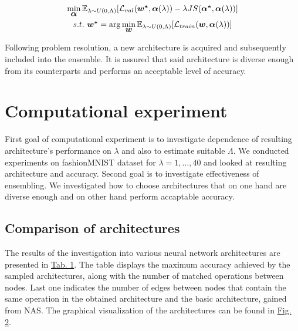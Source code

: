 \documentclass{article}
\begin{document}
\begin{gather*}
    \min_{\mbox{\boldmath{$\alpha$}}} \mathbb{E}_{\lambda \sim U(0, \Lambda)} [\mathcal{L}_{val}(\mbox{\boldmath{$w^*$}}, \mbox{\boldmath{$\alpha$}}(\lambda)) - \lambda JS(\mbox{\boldmath{$\alpha^*$}}, \mbox{\boldmath{$\alpha$}}(\lambda))] \\
    s.t. \text{ } \mbox{\boldmath{$w^*$}} = \arg \min_{\mbox{\boldmath{$w$}}} \mathbb{E}_{\lambda \sim U(0, \Lambda)}[\mathcal{L}_{train}(\mbox{\boldmath{$w$}}, \mbox{\boldmath{$\alpha$}}(\lambda))]
\end{gather*}

Following problem resolution, a new architecture is acquired and subsequently included into the ensemble.
It is assured that said architecture is diverse enough from its counterparts and performs an acceptable level of accuracy.

\section{Computational experiment}

First goal of computational experiment is to investigate dependence of resulting architecture's performance on $\lambda$ and also to estimate suitable $\Lambda$.
We conducted experiments on fashionMNIST dataset for $\lambda = 1, \ldots, 40$ and looked at resulting architecture and accuracy.
Second goal is to investigate effectiveness of ensembling.
We investigated how to choose architectures that on one hand are diverse enough and on other hand perform accaptable accuracy.

\subsection{Comparison of architectures}

The results of the investigation into various neural network architectures are presented in \hyperref[tab:prelim]{Tab. 1}.
The table displays the maximum accuracy achieved by the sampled architectures, along with the number of matched operations between nodes.
Last one indicates the number of edges between nodes that contain the same operation in the obtained architecture and the basic architecture, gained from NAS.
The graphical visualization of the architectures can be found in \hyperref[fig:graph1]{Fig. 2}.
\end{document}
